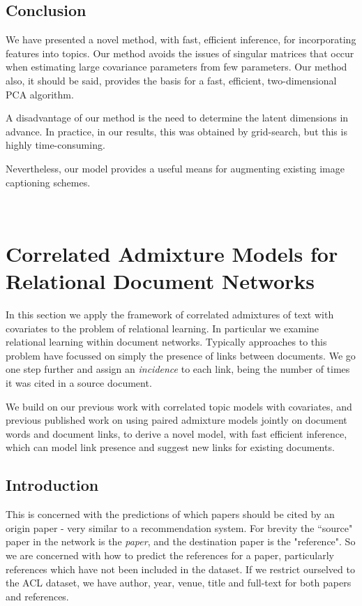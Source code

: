 \section{Conclusion}
We have presented a novel method, with fast, efficient inference, for incorporating features into topics. Our method avoids the issues of singular matrices that occur when estimating large covariance parameters from few parameters. Our method also, it should be said, provides the basis for a fast, efficient, two-dimensional PCA algorithm.

A disadvantage of our method is the need to determine the latent dimensions in advance. In practice, in our results, this was obtained by grid-search, but this is highly time-consuming.

Nevertheless, our model provides a useful means for augmenting existing image captioning schemes.

\

\newcommand \thdo { { \vv{\theta}_{d\cdot} } }
\newcommand \thok { { \vv{\theta}_{\cdot k} } }
\newcommand \phok { { \vv{\phi}_{\cdot k} } }
\newcommand \phdo { { \vv{\phi}_{d\cdot} } }

\chapter{Correlated Admixture Models for Relational Document Networks}
In this section we apply the framework of correlated admixtures of text with covariates to the problem of relational learning. In particular we examine relational learning within document networks. Typically approaches to this problem have focussed on simply the presence of links between documents. We go one step further and assign an \emph{incidence} to each link, being the number of times it was cited in a source document.

We build on our previous work with correlated topic models with covariates, and previous published work on using paired admixture models jointly on document words and document links, to derive a novel model, with fast efficient inference, which can model link presence and suggest new links for existing documents.
\section{Introduction}
This is concerned with the predictions of which papers should be cited by an origin paper - very similar to a recommendation system. For brevity the ``source" paper in the network is the \emph{paper}, and the destination paper is the "reference". So we are concerned with how to predict the references for a paper, particularly references which have not been included in the dataset. If we restrict ourselved to the ACL dataset, we have author, year, venue, title and full-text for both papers and references.

